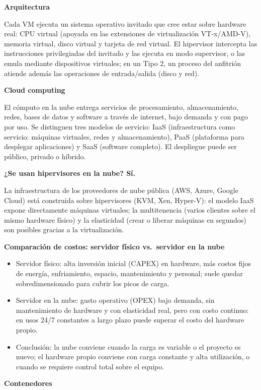 \documentclass[11pt,a4paper]{report}
\begin{document}
\textbf{Arquitectura}

Cada VM ejecuta un sistema operativo invitado que cree estar sobre hardware real: CPU virtual (apoyada en las extensiones de virtualización VT-x/AMD-V), memoria virtual, disco virtual y tarjeta de red virtual. El hipervisor intercepta las instrucciones privilegiadas del invitado y las ejecuta en modo supervisor, o las emula mediante dispositivos virtuales; en un Tipo 2, un proceso del anfitrión atiende además las operaciones de entrada/salida (disco y red).

\textbf{Cloud computing}

El cómputo en la nube entrega servicios de procesamiento, almacenamiento, redes, bases de datos y software a través de internet, bajo demanda y con pago por uso. Se distinguen tres modelos de servicio: IaaS (infraestructura como servicio: máquinas virtuales, redes y almacenamiento), PaaS (plataforma para desplegar aplicaciones) y SaaS (software completo). El despliegue puede ser público, privado o híbrido.

\textbf{¿Se usan hipervisores en la nube? Sí.}

La infraestructura de los proveedores de nube pública (AWS, Azure, Google Cloud) está construida sobre hipervisores (KVM, Xen, Hyper-V): el modelo IaaS expone directamente máquinas virtuales; la multitenencia (varios clientes sobre el mismo hardware físico) y la elasticidad (crear o liberar máquinas en segundos) son posibles gracias a la virtualización.

\textbf{Comparación de costos: servidor físico vs.\ servidor en la nube}

\begin{itemize}
  \item Servidor físico: alta inversión inicial (CAPEX) en hardware, más costos fijos de energía, enfriamiento, espacio, mantenimiento y personal; suele quedar sobredimensionado para cubrir los picos de carga.
  \item Servidor en la nube: gasto operativo (OPEX) bajo demanda, sin mantenimiento de hardware y con elasticidad real, pero con costo continuo: en usos 24/7 constantes a largo plazo puede superar el costo del hardware propio.
  \item Conclusión: la nube conviene cuando la carga es variable o el proyecto es nuevo; el hardware propio conviene con carga constante y alta utilización, o cuando se requiere control total sobre el equipo.
\end{itemize}

\textbf{Contenedores}
\end{document}
